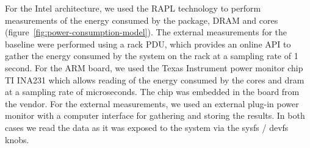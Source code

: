 For the Intel architecture, we used the RAPL technology to perform measurements
of the energy consumed by the package, DRAM and cores 
(figure~\ref{fig:power-consumption-model}).
The external measurements for the baseline were performed using a
rack PDU, which provides an online API to gather the energy consumed
by the system on the rack at a sampling rate of 1 second.
For the ARM board, we used the Texas Instrument power monitor
chip TI INA231 which allows reading of the energy consumed by the
cores and dram at a sampling rate of microseconds. The chip was
embedded in the board from the vendor. For the external measurements,
we used an external plug-in power monitor with a computer interface
for gathering and storing the results.
In both cases we read the data as it was exposed to the system via
the sysfs / devfs knobs.
